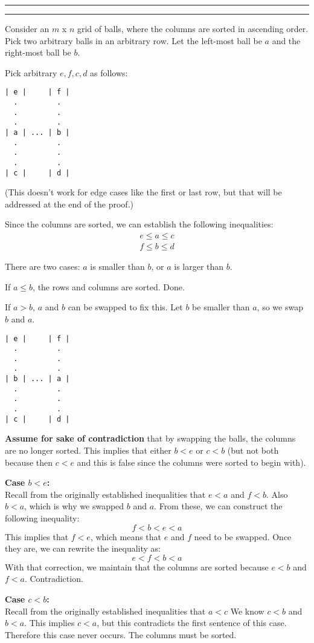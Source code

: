 \documentclass[11pt]{article}
\newcounter{questionCounter}
\newcounter{partCounter}[questionCounter]
\newenvironment{question}[2][\arabic{questionCounter}]{%
    \setcounter{partCounter}{0}%
    \vspace{.25in} \hrule \vspace{0.5em}%
        \noindent{\bf #2}%
    \vspace{0.8em} \hrule \vspace{.10in}%
    \addtocounter{questionCounter}{1}%
}{}
\begin{document}
\begin{question}{Your Wandering Mind}
Consider an $m$ x $n$ grid of balls, where the columns are sorted in ascending
order. Pick two arbitrary balls in an arbitrary row. Let the left-most ball be
$a$ and the right-most ball be $b$. 

Pick arbitrary $e,f,c,d$ as follows:
\begin{verbatim}
| e |     | f |
  .         .
  .         .
  .         .
| a | ... | b |
  .         .
  .         .
  .         .
| c |     | d |
\end{verbatim}
(This doesn't work for edge cases like the first or last row, but that will
be addressed at the end of the proof.)

Since the columns are sorted, we can establish the following inequalities:
\begin{align*}
&e \leq a \leq c&\\
&f \leq b \leq d&
\end{align*}

There are two cases: $a$ is smaller than $b$, or $a$ is larger than $b$.

If $a \leq b$, the rows and columns are sorted. Done.

If $a > b$, $a$ and $b$ can be swapped to fix this. Let $b$ be smaller than $a$,
 so we swap $b$ and $a$. 

\begin{verbatim}
| e |     | f |
  .         .
  .         .
  .         .
| b | ... | a |
  .         .
  .         .
  .         .
| c |     | d |
\end{verbatim}

\textbf{Assume for sake of contradiction} that by swapping
the balls, the columns are no longer sorted. This implies that either $b < e$ or
$c < b$ (but not both because then $c < e$ and this is false since the columns
were sorted to begin with).

\textbf{Case $b < e$:}\\
Recall from the originally established inequalities that $e < a$ and 
$f < b$. Also $b < a$, which is why we swapped $b$ and $a$. From these, we can 
construct the following inequality:
$$ f < b < e < a $$
This implies that $f < e$, which means that $e$ and $f$ need to be swapped.
Once they are, we can rewrite the inequality as:
$$ e < f < b < a $$
With that correction, we maintain that the columns are sorted because 
$e < b$ and $f < a$. Contradiction.

\textbf{Case $c < b$:}\\
Recall from the originally established inequalities that $a < c$
We know $c < b$ and $b < a$. This implies $c < a$, but this contradicts the 
first sentence of this case. Therefore this case never occurs. The columns
must be sorted.


\end{question}
\end{document}

